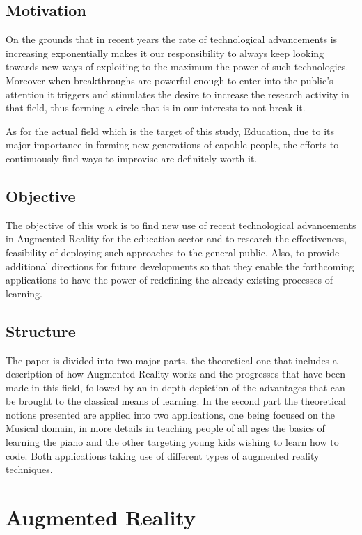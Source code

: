 \documentclass[12 pct]{report}
\begin{document}
\section{Motivation}
On the grounds that in recent years the rate of technological advancements is increasing exponentially makes it our responsibility to always keep looking towards new ways of exploiting to the maximum the power of such technologies. Moreover when breakthroughs are powerful enough to enter into the public's attention it triggers and stimulates the desire to increase the research activity in that field, thus forming a circle that is in our interests to not break it.

As for the actual field which is the target of this study, Education, due to its major importance in forming new generations of capable people, the efforts to continuously find ways to improvise are definitely worth  it. 

\section{Objective}
The objective of this work is to find new use of recent technological advancements in Augmented Reality for the education sector and to research the effectiveness, feasibility of deploying such approaches to the general public. Also, to provide additional directions for future developments so that they enable the  forthcoming applications to have the power of redefining the already existing processes of learning.

\section{Structure}
The paper is divided into two major parts, the theoretical one that includes a description of how Augmented Reality works and the progresses that have been made in this field, followed by an in-depth depiction of the advantages that can be brought to the classical means of learning. In the second part the theoretical notions presented are applied into two applications, one being focused on the Musical domain, in more details in teaching people of all ages the basics of learning the piano and the other targeting young kids wishing to learn how to code. Both applications taking use of different types of augmented reality techniques.
\chapter{Augmented Reality}
\end{document}
